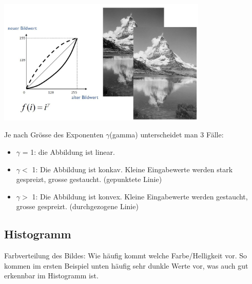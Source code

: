\begin{center}
	\includegraphics[height=6cm,keepaspectratio]{images/sw01/Gammakorrektur.JPG}
\end{center}

Je nach Grösse des Exponenten $\gamma$(gamma) unterscheidet man 3 Fälle:
\begin{itemize}
	\itemsep0pt
	\item $\gamma$ = 1: die Abbildung ist linear.
	\item $\gamma <$ 1: Die Abbildung ist konkav. Kleine Eingabewerte werden stark gespreizt, grosse gestaucht. (gepunktete Linie)
	\item $\gamma >$ 1: Die Abbildung ist konvex. Kleine Eingabewerte werden gestaucht, grosse gespreizt. (durchgezogene Linie)
\end{itemize}



\subsection{Histogramm}
Farbverteilung des Bildes: Wie häufig kommt welche Farbe/Helligkeit vor. So kommen im ersten Beispiel unten häufig sehr dunkle Werte vor, was auch gut erkennbar im Histogramm ist.

